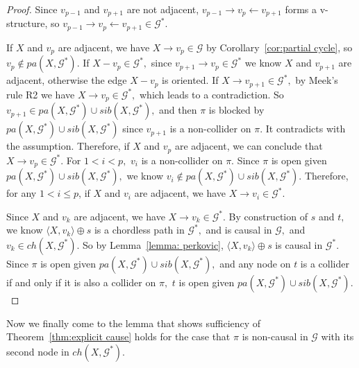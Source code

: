 \documentclass{article}
\begin{document}
\begin{proof}
Since $v_{p-1}$ and $v_{p+1}$ are not adjacent, $v_{p-1}\to v_p\leftarrow v_{p+1}$ forms a v-structure, so $v_{p-1}\to v_p\leftarrow v_{p+1}\in \mathcal{G}^*.$ 

If $X$ and $v_p$ are adjacent, we have $X\to v_p\in \mathcal{G}$ by Corollary~\ref{cor:partial cycle}, so $v_p\not\in pa(X,\mathcal{G}^*).$ If $X-v_p\in \mathcal{G}^*,$ since $v_{p+1}\to v_p\in \mathcal{G}^*$ we know $X$ and $v_{p+1}$ are adjacent, otherwise the edge $X-v_p$ is oriented. If $X\to v_{p+1}\in \mathcal{G}^*,$ by Meek's rule R2 we have $X\to v_p\in \mathcal{G}^*,$ which leads to a contradiction. So $v_{p+1}\in pa(X,\mathcal{G}^*)\cup sib(X,\mathcal{G}^*),$ and then $\pi$ is blocked by $pa(X,\mathcal{G}^*)\cup sib(X, \mathcal{G}^*)$ since $v_{p+1}$ is a non-collider on $\pi.$ It contradicts with the assumption. Therefore, if $X$ and $v_p$ are adjacent, we can conclude that $X\to v_p\in \mathcal{G}^*.$ For $1< i< p,$ $v_i$ is a non-collider on $\pi.$ Since $\pi$ is open given $pa(X,\mathcal{G}^*)\cup sib(X,\mathcal{G}^*),$ we know $v_i\not\in pa(X,\mathcal{G}^*)\cup sib(X,\mathcal{G}^*).$  Therefore, for any $1<i\le p$, if $X$ and $v_i$ are adjacent, we have $X\to v_i\in \mathcal{G}^*.$ 

Since $X$ and $v_k$ are adjacent, we have $X\to v_k\in \mathcal{G}^*.$ By construction of $s$ and $t,$ we know $\langle X,v_k\rangle \oplus s$ is a chordless path in $\mathcal{G}^*,$ and is causal in $\mathcal{G},$ and $v_k\in ch(X,\mathcal{G}^*).$ So by Lemma~\ref{lemma: perkovic}, $\langle X,v_k\rangle \oplus s$ is causal in $\mathcal{G}^*.$ Since $\pi$ is open given $pa(X,\mathcal{G}^*)\cup sib(X,\mathcal{G}^*),$ and any node on $t$ is a collider if and only if it is also a collider on $\pi,$ $t$ is open given $pa(X,\mathcal{G}^*)\cup sib(X,\mathcal{G}^*).$ 
\end{proof}

Now we finally come to the lemma that shows sufficiency of Theorem~\ref{thm:explicit cause} holds for the case that $\pi$ is non-causal in $\mathcal{G}$ with its second node in $ch(X,\mathcal{G}^*).$ 
\end{document}
